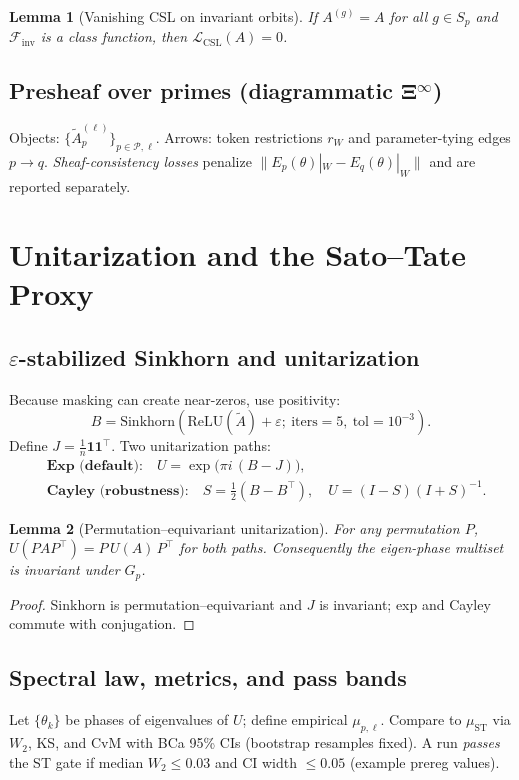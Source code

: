 \documentclass[11pt]{article}
\newtheorem{lemma}{Lemma}
\theoremstyle{remark}
\newcommand{\one}{\mathbf{1}}
\newcommand{\ST}{\mathrm{ST}}
\begin{document}
\begin{lemma}[Vanishing CSL on invariant orbits]
If $A^{(g)}=A$ for all $g\in S_p$ and $\mathcal F_{\mathrm{inv}}$ is a class function, then $\mathcal L_{\mathrm{CSL}}(A)=0$.
\end{lemma}

\subsection{Presheaf over primes (diagrammatic Ξ$^\infty$)}
Objects: $\{\widetilde A_p^{(\ell)}\}_{p\in\mathcal P,\ell}$. Arrows: token restrictions $r_W$ and parameter-tying edges $p\to q$. \emph{Sheaf-consistency losses} penalize $\|E_p(\theta)|_W - E_q(\theta)|_W\|$ and are reported separately.

\section{Unitarization and the Sato--Tate Proxy}

\subsection{$\varepsilon$-stabilized Sinkhorn and unitarization}
Because masking can create near-zeros, use positivity:
\[
  B=\mathrm{Sinkhorn}(\mathrm{ReLU}(\widetilde A)+\varepsilon;\ \text{iters}=5,\ \text{tol}=10^{-3}).
\]
Define $J=\frac{1}{n}\one\one^\top$. Two unitarization paths:
\begin{align*}
  &\textbf{Exp (default):}\quad U = \exp\big(\pi i\, (B-J)\big),\\
  &\textbf{Cayley (robustness):}\quad S=\tfrac12(B-B^\top),\quad U=(I-S)(I+S)^{-1}.
\end{align*}

\begin{lemma}[Permutation–equivariant unitarization]
For any permutation $P$, $U(PAP^\top)=P\,U(A)\,P^\top$ for both paths. Consequently the eigen-phase multiset is invariant under $G_p$.
\end{lemma}
\begin{proof}
Sinkhorn is permutation–equivariant and $J$ is invariant; exp and Cayley commute with conjugation.
\end{proof}

\subsection{Spectral law, metrics, and pass bands}
Let $\{\theta_k\}$ be phases of eigenvalues of $U$; define empirical $\mu_{p,\ell}$. Compare to $\mu_{\ST}$ via $W_2$, KS, and CvM with BCa 95\% CIs (bootstrap resamples fixed). A run \emph{passes} the ST gate if median $W_2\le 0.03$ and CI width $\le 0.05$ (example prereg values).
\end{document}
